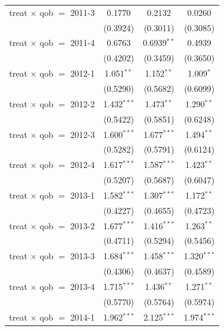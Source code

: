 \begin{table}[htbp]
\begin{tabular}{lccc}
      treat $\times$ qob $=$ 2011-3  & 0.1770        & 0.2132         & 0.0260\\   
                                     & (0.3924)      & (0.3011)       & (0.3085)\\   
      treat $\times$ qob $=$ 2011-4  & 0.6763        & 0.6939$^{**}$  & 0.4939\\   
                                     & (0.4202)      & (0.3459)       & (0.3650)\\   
      treat $\times$ qob $=$ 2012-1  & 1.051$^{**}$  & 1.152$^{**}$   & 1.009$^{*}$\\   
                                     & (0.5290)      & (0.5682)       & (0.6099)\\   
      treat $\times$ qob $=$ 2012-2  & 1.432$^{***}$ & 1.473$^{**}$   & 1.290$^{**}$\\   
                                     & (0.5422)      & (0.5851)       & (0.6248)\\   
      treat $\times$ qob $=$ 2012-3  & 1.600$^{***}$ & 1.677$^{***}$  & 1.494$^{**}$\\   
                                     & (0.5282)      & (0.5791)       & (0.6124)\\   
      treat $\times$ qob $=$ 2012-4  & 1.617$^{***}$ & 1.587$^{***}$  & 1.423$^{**}$\\   
                                     & (0.5207)      & (0.5687)       & (0.6047)\\   
      treat $\times$ qob $=$ 2013-1  & 1.582$^{***}$ & 1.307$^{***}$  & 1.172$^{**}$\\   
                                     & (0.4227)      & (0.4655)       & (0.4723)\\   
      treat $\times$ qob $=$ 2013-2  & 1.677$^{***}$ & 1.416$^{***}$  & 1.263$^{**}$\\   
                                     & (0.4711)      & (0.5294)       & (0.5456)\\   
      treat $\times$ qob $=$ 2013-3  & 1.684$^{***}$ & 1.458$^{***}$  & 1.320$^{***}$\\   
                                     & (0.4306)      & (0.4637)       & (0.4589)\\   
      treat $\times$ qob $=$ 2013-4  & 1.715$^{***}$ & 1.436$^{**}$   & 1.271$^{**}$\\   
                                     & (0.5770)      & (0.5764)       & (0.5974)\\   
      treat $\times$ qob $=$ 2014-1  & 1.962$^{***}$ & 2.125$^{***}$  & 1.974$^{***}$\\   

\end{tabular}
\end{table}
